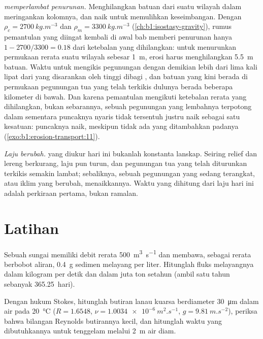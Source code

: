 \emph{ memperlambat penurunan.} Menghilangkan batuan dari suatu wilayah dalam  meringankan kolomnya, dan  naik untuk memulihkan keseimbangan. Dengan $\rho_c
= \qty{2700}{kg.m^{-3}}$ dan $\rho_m = \qty{3300}{kg.m^{-3}}$
(\cref{ch:b1:isostasy-gravity}), rumus pemantulan yang diingat kembali di awal bab memberi penurunan hanya $1 - 2700/3300 = 0.18$ dari ketebalan yang dihilangkan: untuk menurunkan permukaan rerata suatu wilayah sebesar \qty{1}{m}, erosi harus menghilangkan \qty{5.5}{m} batuan. Waktu untuk mengikis pegunungan dengan demikian lebih dari lima kali lipat dari yang disarankan oleh tinggi dibagi , dan batuan yang kini berada di permukaan pegunungan tua yang telah terkikis dulunya berada beberapa kilometer di bawah. Dan karena pemantulan mengikuti ketebalan rerata yang dihilangkan, bukan sebarannya, sebuah pegunungan yang lembahnya terpotong dalam sementara puncaknya nyaris tidak tersentuh justru naik sebagai satu kesatuan: puncaknya naik, meskipun tidak ada yang ditambahkan padanya (\cref{exo:b1:erosion-transport:11}).

\emph{Laju berubah.}  yang diukur hari ini bukanlah konstanta lanskap. Seiring relief dan lereng berkurang, laju pun turun, dan pegunungan tua yang telah diturunkan terkikis semakin lambat; sebaliknya, sebuah pegunungan yang sedang terangkat, atau iklim yang berubah, menaikkannya. Waktu yang dihitung dari laju hari ini adalah perkiraan pertama, bukan ramalan.

\section{Latihan}

\begin{exercise}[$\star$]\label{exo:b1:erosion-transport:1}
Sebuah sungai memiliki debit rerata \qty{500}{m^3.s^{-1}} dan membawa, sebagai rerata berbobot aliran, \qty{0.4}{g} sedimen melayang per liter. Hitunglah fluks melayangnya dalam kilogram per detik dan dalam juta ton setahun (ambil satu tahun sebanyak \num{365.25}~hari).
\end{exercise}

\begin{exercise}[$\star$]\label{exo:b1:erosion-transport:2}
Dengan hukum Stokes, hitunglah  butiran lanau kuarsa berdiameter
\qty{30}{\micro m} dalam air pada \qty{20}{\celsius} ($R = 1.6548$, $\nu =
\qty{1.0034e-6}{m^2.s^{-1}}$, $g = \qty{9.81}{m.s^{-2}}$), periksa bahwa bilangan Reynolds butirannya kecil, dan hitunglah waktu yang dibutuhkannya untuk tenggelam melalui
\qty{2}{m} air diam.
\end{exercise}

